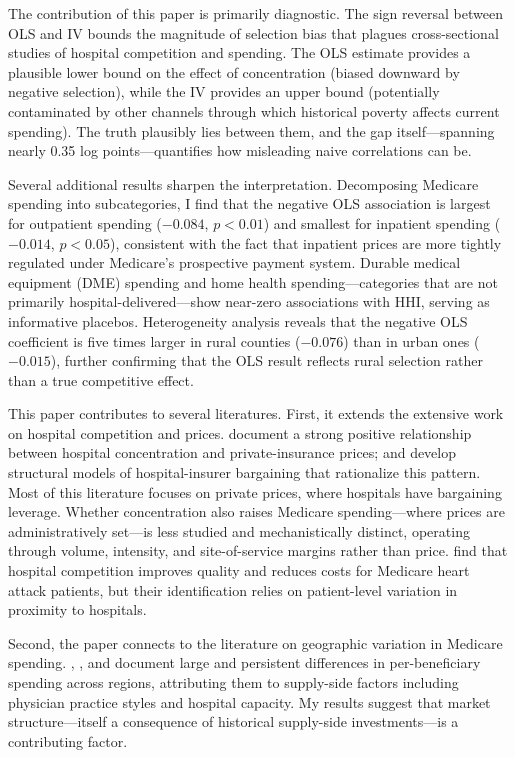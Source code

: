 \documentclass[12pt]{article}
\begin{document}
The contribution of this paper is primarily diagnostic. The sign reversal between OLS and IV bounds the magnitude of selection bias that plagues cross-sectional studies of hospital competition and spending. The OLS estimate provides a plausible lower bound on the effect of concentration (biased downward by negative selection), while the IV provides an upper bound (potentially contaminated by other channels through which historical poverty affects current spending). The truth plausibly lies between them, and the gap itself---spanning nearly 0.35 log points---quantifies how misleading naive correlations can be.

Several additional results sharpen the interpretation. Decomposing Medicare spending into subcategories, I find that the negative OLS association is largest for outpatient spending ($-0.084$, $p < 0.01$) and smallest for inpatient spending ($-0.014$, $p < 0.05$), consistent with the fact that inpatient prices are more tightly regulated under Medicare's prospective payment system. Durable medical equipment (DME) spending and home health spending---categories that are not primarily hospital-delivered---show near-zero associations with HHI, serving as informative placebos. Heterogeneity analysis reveals that the negative OLS coefficient is five times larger in rural counties ($-0.076$) than in urban ones ($-0.015$), further confirming that the OLS result reflects rural selection rather than a true competitive effect.

This paper contributes to several literatures. First, it extends the extensive work on hospital competition and prices. \citet{cooper2019prices} document a strong positive relationship between hospital concentration and private-insurance prices; \citet{gowrisankaran2015mergers} and \citet{ho2017insurer} develop structural models of hospital-insurer bargaining that rationalize this pattern. Most of this literature focuses on private prices, where hospitals have bargaining leverage. Whether concentration also raises Medicare spending---where prices are administratively set---is less studied and mechanistically distinct, operating through volume, intensity, and site-of-service margins rather than price. \citet{kessler2000competition} find that hospital competition improves quality and reduces costs for Medicare heart attack patients, but their identification relies on patient-level variation in proximity to hospitals.

Second, the paper connects to the literature on geographic variation in Medicare spending. \citet{wennberg2002geography}, \citet{skinner2011causes}, and \citet{cutler2010geographic} document large and persistent differences in per-beneficiary spending across regions, attributing them to supply-side factors including physician practice styles and hospital capacity. My results suggest that market structure---itself a consequence of historical supply-side investments---is a contributing factor.
\end{document}
